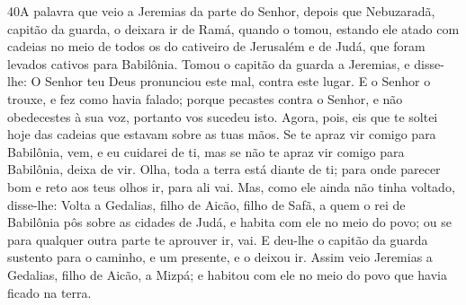 \medskip

\lettrine{40} A palavra que veio a Jeremias da parte do
Senhor, depois que Nebuzaradã, capitão da guarda, o deixara ir de
Ramá, quando o tomou, estando ele atado com cadeias no meio de todos
os do cativeiro de Jerusalém e de Judá, que foram levados cativos
para Babilônia. Tomou o capitão da guarda a Jeremias, e
disse-lhe: O Senhor teu Deus pronunciou este mal, contra este lugar.
E o Senhor o trouxe, e fez como havia falado; porque pecastes
contra o Senhor, e não obedecestes à sua voz, portanto vos sucedeu
isto. Agora, pois, eis que te soltei hoje das cadeias que
estavam sobre as tuas mãos. Se te apraz vir comigo para Babilônia,
vem, e eu cuidarei de ti, mas se não te apraz vir comigo para
Babilônia, deixa de vir. Olha, toda a terra está diante de ti; para
onde parecer bom e reto aos teus olhos ir, para ali vai. Mas,
como ele ainda não tinha voltado, disse-lhe: Volta a Gedalias, filho
de Aicão, filho de Safã, a quem o rei de Babilônia pôs sobre as
cidades de Judá, e habita com ele no meio do povo; ou se para
qualquer outra parte te aprouver ir, vai. E deu-lhe o capitão da
guarda sustento para o caminho, e um presente, e o deixou ir.
Assim veio Jeremias a Gedalias, filho de Aicão, a Mizpá; e
habitou com ele no meio do povo que havia ficado na terra.


